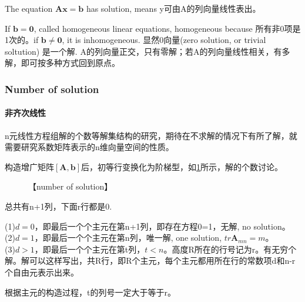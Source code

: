 \documentclass[UTF8]{../../09-Mathematics}
\begin{document}
The equation $\boldsymbol A \boldsymbol x = \boldsymbol b$ has solution, means y可由A的列向量线性表出。

If $\boldsymbol b = \boldsymbol 0$, called homogeneous linear equations, homogeneous because 所有非0项是1次的。if $\boldsymbol b \neq \boldsymbol 0$, it is inhomogeneous. 显然0向量(zero solution, or trivial soltution) 是一个解. A的列向量正交，只有零解；若A的列向量线性相关，有多解，即可按多种方式回到原点。






\subsubsection{Number of solution}

\paragraph{非齐次线性}

n元线性方程组解的个数等解集结构的研究，期待在不求解的情况下有所了解，就需要研究系数矩阵表示的n维向量空间的性质。

构造增广矩阵$[\boldsymbol A,\boldsymbol b ]$后，初等行变换化为阶梯型，如\ref{fig:number_of_solution}所示，解的个数讨论。

\begin{figure}[h]
  \centering
  \caption{【number of solution】}\label{fig:number_of_solution}
\end{figure}

总共有n+1列，下面r行都是0.

(1)$d = 0$，即最后一个个主元在第n+1列，即存在方程0=1，无解, no solution。\\
(2)$d = 1$，即最后一个个主元在第n列，唯一解, one solution, $tr \boldsymbol A_{mn} = m$。\\
(3)$d > 1$，即最后一个个主元在第t列，$t < n$。高度R所在的行号记为r。有无穷个解。解可以这样写出，共R行，即R个主元，每个主元都用所在行的常数项d和n-r个自由元表示出来。

根据主元的构造过程，t的列号一定大于等于r。
\end{document}
